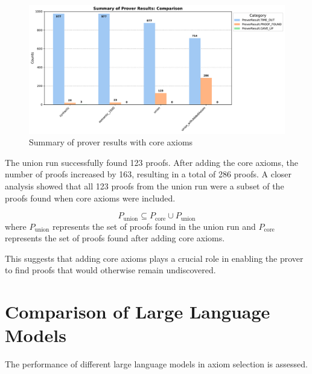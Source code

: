 \documentclass[english,version-2020-11]{uzl-thesis}
\begin{document}
\begin{figure}[h!]
    \centering
    \includegraphics[width=\textwidth]{standard_mode_output.pdf}
    \caption{Summary of prover results with core axioms}
    \label{fig:prover_results_with_core_axioms}
\end{figure}
\FloatBarrier

The union run successfully found 123 proofs. After adding the core axioms, the number of proofs increased by 163, resulting in a total of 286 proofs. A closer analysis showed that all 123 proofs from the union run were a subset of the proofs found when core axioms were included. 

\begin{equation}
    P_{\text{union}} \subseteq P_{\text{core}} \cup P_{\text{union}}
\end{equation}
where \( P_{\text{union}} \) represents the set of proofs found in the union run and \( P_{\text{core}} \) represents the set of proofs found after adding core axioms.


This suggests that adding core axioms plays a crucial role in enabling the prover to find proofs that would otherwise remain undiscovered.


\section{Comparison of Large Language Models}

The performance of different large language models in axiom selection is assessed.
\end{document}

